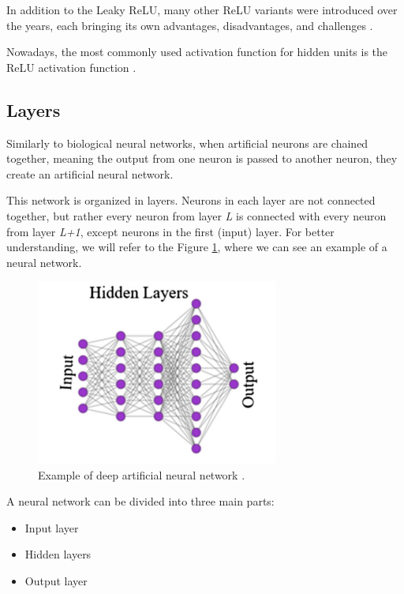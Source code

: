 In addition to the Leaky ReLU, many other ReLU variants were introduced over the years, each bringing its own advantages, disadvantages, and challenges \cite{Dubey2022, Aby2025}.

Nowadays, the most commonly used activation function for hidden units is the ReLU activation function \cite{Dubey2022, Goodfellow2016, LeCun2015}.

\subsection{Layers}

Similarly to biological neural networks, when artificial neurons are chained together, meaning the output from one neuron is passed to another neuron, they create an artificial neural network.

This network is organized in layers. Neurons in each layer are not connected together, but rather every neuron from layer \textit{L} is connected with every neuron from layer \textit{L+1}, except neurons in the first (input) layer. For better understanding, we will refer to the Figure \ref{tab:artificial-nn}, where we can see an example of a neural network.

\begin{figure}[H]
\begin{centering}
\includegraphics[width=8cm]{assets/images/neural_net.png}
\par\end{centering}
\caption{Example of deep artificial neural network \cite{TalaeiKhoei2023}.}
\label{tab:artificial-nn}
\end{figure}

A neural network can be divided into three main parts:

\begin{itemize}
    \item Input layer
    \item Hidden layers
    \item Output layer
\end{itemize}

